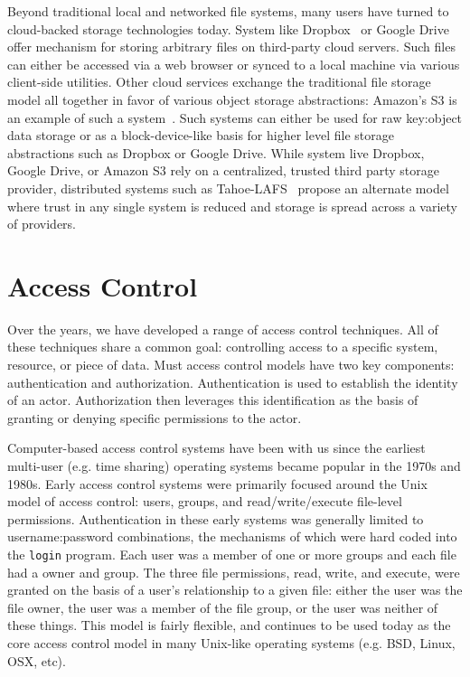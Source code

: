 Beyond traditional local and networked file systems, many users have
turned to cloud-backed storage technologies today. System like
Dropbox~\cite{dropbox} or Google Drive~\cite{google-drive} offer
mechanism for storing arbitrary files on third-party cloud
servers. Such files can either be accessed via a web browser or synced
to a local machine via various client-side utilities. Other cloud
services exchange the traditional file storage model all together in
favor of various object storage abstractions: Amazon's S3 is an
example of such a system~\cite{amazon-s3}. Such systems can either be
used for raw key:object data storage or as a block-device-like basis
for higher level file storage abstractions such as Dropbox or Google
Drive. While system live Dropbox, Google Drive, or Amazon S3 rely on a
centralized, trusted third party storage provider, distributed systems
such as Tahoe-LAFS~\cite{wilcox-o'hearn2008} propose an alternate
model where trust in any single system is reduced and storage is
spread across a variety of providers.

\section{Access Control}
\label{chap:background:ac}

Over the years, we have developed a range of access control
techniques. All of these techniques share a common goal: controlling
access to a specific system, resource, or piece of data. Must access
control models have two key components: authentication and
authorization.  Authentication is used to establish the identity of an
actor. Authorization then leverages this identification as the basis
of granting or denying specific permissions to the actor.

Computer-based access control systems have been with us since the
earliest multi-user (e.g. time sharing) operating systems became
popular in the 1970s and 1980s. Early access control systems were
primarily focused around the Unix model of access control: users,
groups, and read/write/execute file-level permissions. Authentication
in these early systems was generally limited to username:password
combinations, the mechanisms of which were hard coded into the
\texttt{login} program. Each user was a member of one or more groups
and each file had a owner and group. The three file permissions, read,
write, and execute, were granted on the basis of a user's relationship
to a given file: either the user was the file owner, the user was a
member of the file group, or the user was neither of these
things. This model is fairly flexible, and continues to be used today
as the core access control model in many Unix-like operating systems
(e.g. BSD, Linux, OSX, etc).

